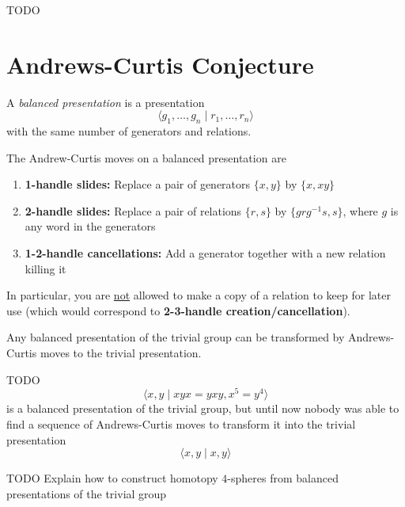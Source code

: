 TODO


\section{Andrews-Curtis Conjecture}

\citep{SCP4}

\begin{definition}
	A \textit{balanced presentation}  is a presentation
	\[
		\langle g_1, \ldots, g_n \mid r_1, \ldots, r_n \rangle
	\]
	with the same number of generators and relations.
	
	The Andrew-Curtis moves on a balanced presentation are
	\begin{enumerate}[label=(\roman*)]
		\item \textbf{1-handle slides:} Replace a pair of generators
		$ \{ x, y \} $ by $ \{ x, xy \} $
		
		\item \textbf{2-handle slides:} Replace a pair of relations
		$ \{ r, s \} $ by $ \{ grg^{-1}s, s \} $, where $ g $ is any word in the generators
		
		\item \textbf{1-2-handle cancellations:} Add a generator together with
		a new relation killing it
	\end{enumerate}
	In particular, you are \underline{not} allowed to make a copy of a relation to
	keep for later use (which would correspond to 
	\textbf{2-3-handle creation/cancellation}).
\end{definition}

\begin{conjecture*}
	Any balanced presentation of the trivial group can be transformed
	by Andrews-Curtis moves to the trivial presentation.
\end{conjecture*}

\begin{example}
	TODO
	\[
		\langle x, y \mid xyx = yxy, x^{5} = y^{4} \rangle
	\]
	is a balanced presentation of the trivial group,
	but until now nobody was able to find a sequence of
	Andrews-Curtis moves to transform it into the trivial presentation
	\[
		\langle x, y \mid x, y \rangle
	\]
\end{example}

TODO
Explain how to construct homotopy $4$-spheres from balanced
presentations of the trivial group
\citep{akbulut1985potential}


